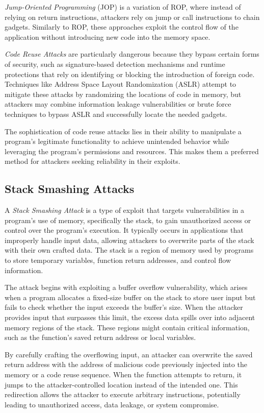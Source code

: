 \textit{Jump-Oriented Programming} (JOP) is a variation of ROP, where instead of
relying on return instructions, attackers rely on jump or call instructions to
chain gadgets. Similarly to ROP, these approaches exploit the control flow of
the application without introducing new code into the memory space.

\textit{Code Reuse Attacks} are particularly dangerous because they bypass certain
forms of security, such as signature-based detection mechanisms and runtime
protections that rely on identifying or blocking the introduction of foreign
code. Techniques like Address Space Layout Randomization (ASLR) attempt to mitigate
these attacks by randomizing the locations of code in memory, but attackers may
combine information leakage vulnerabilities or brute force techniques to bypass
ASLR and successfully locate the needed gadgets.

The sophistication of code reuse attacks lies in their ability to manipulate a
program's legitimate functionality to achieve unintended behavior while
leveraging the program's permissions and resources. This makes them a preferred method
for attackers seeking reliability in their exploits.

\subsection{Stack Smashing Attacks}
\label{subsec:background_stacksmashing}

A \textit{Stack Smashing Attack} is a type of exploit that targets vulnerabilities
in a program's use of memory, specifically the stack, to gain unauthorized access
or control over the program's execution. It typically occurs in applications
that improperly handle input data, allowing attackers to overwrite parts of the stack
with their own crafted data. The stack is a region of memory used by programs to
store temporary variables, function return addresses, and control flow
information.

The attack begins with exploiting a buffer overflow vulnerability, which arises when
a program allocates a fixed-size buffer on the stack to store user input but fails
to check whether the input exceeds the buffer's size. When the attacker provides
input that surpasses this limit, the excess data spills over into adjacent memory
regions of the stack. These regions might contain critical information, such as the
function's saved return address or local variables.

By carefully crafting the overflowing input, an attacker can overwrite the saved
return address with the address of malicious code previously injected into the
memory or a code reuse sequence. When the function attempts to return, it jumps
to the attacker-controlled location instead of the intended one. This redirection
allows the attacker to execute arbitrary instructions, potentially leading to
unauthorized access, data leakage, or system compromise.


